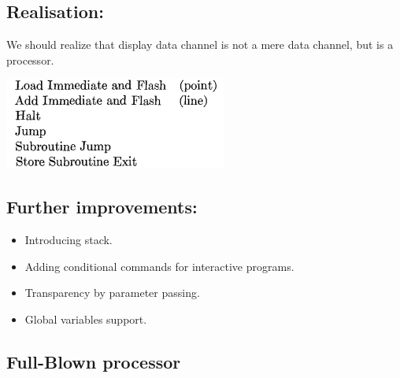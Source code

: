 \documentclass[11pt]{article}
\begin{document}
\subsection{Realisation:}
\label{sec:orga5306df}

We should realize that display data channel is not a mere data channel,
but is a processor.

\begin{center}
\includegraphics[width=.9\linewidth]{./images/reali.png}
\end{center}

\subsection{Further improvements:}
\label{sec:org09d79de}

\begin{itemize}
\item Introducing stack.
\item Adding conditional commands for interactive programs.
\item Transparency by parameter passing.
\item Global variables support.
\end{itemize}

\subsection{Full-Blown processor}
\label{sec:orgacdf4b7}
\end{document}
